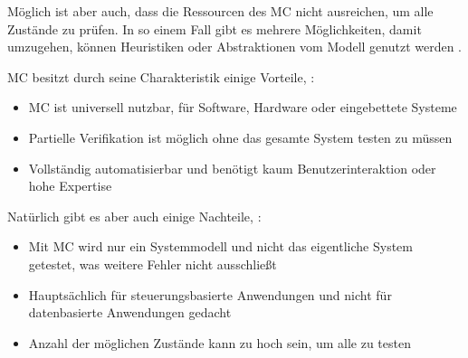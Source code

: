 Möglich ist aber auch, dass die Ressourcen des MC nicht ausreichen, um alle Zustände zu prüfen. In so einem Fall gibt es mehrere Möglichkeiten, damit umzugehen, \zB können Heuristiken oder Abstraktionen vom Modell genutzt werden \cite{Baier2008,Eberhardinger2016}.

MC besitzt durch seine Charakteristik einige Vorteile, \uA \cite{Baier2008}:
\begin{itemize}[noitemsep]
	\item MC ist universell nutzbar, \zB für Software, Hardware oder eingebettete Systeme
	\item Partielle Verifikation ist möglich ohne das gesamte System testen zu müssen
	\item Vollständig automatisierbar und benötigt kaum Benutzerinteraktion oder hohe Expertise
\end{itemize}

Natürlich gibt es aber auch einige Nachteile, \uA \cite{Baier2008}:
\begin{itemize}[noitemsep]
	\item Mit MC wird nur ein Systemmodell und nicht das eigentliche System getestet, was weitere Fehler nicht ausschließt
	\item Hauptsächlich für steuerungsbasierte Anwendungen und nicht für datenbasierte Anwendungen gedacht
	\item Anzahl der möglichen Zustände kann zu hoch sein, um alle zu testen
\end{itemize}